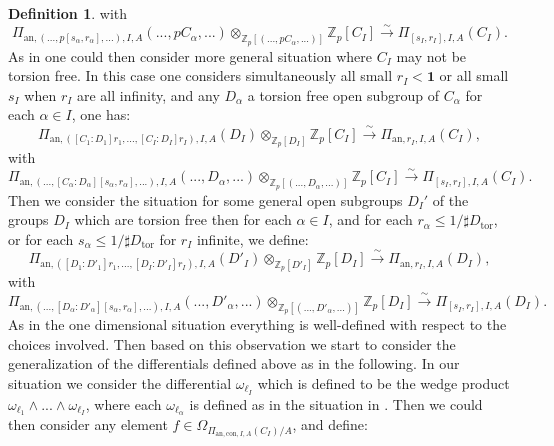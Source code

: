 \documentclass[12pt]{amsart}
\theoremstyle{definition}
\newtheorem{definition}[theorem]{Definition}
\numberwithin{equation}{section}
\begin{document}
\begin{definition}
with
\begin{displaymath}
\Pi_{\mathrm{an},(...,p[s_{\alpha},r_{\alpha}],...),I,A}(...,pC_\alpha,...)\otimes_{\mathbb{Z}_p[(...,pC_\alpha,...)]}	\mathbb{Z}_p[C_I]\overset{\sim}{\rightarrow} \Pi_{[s_I,r_{I}],I,A}(C_I).
\end{displaymath}
As in \cite[Definition 2.1.20]{KPX} one could then consider more general situation where $C_I$ may not be torsion free. In this case one considers simultaneously all small $r_I<\mathbf{1}$ or all small $s_I$ when $r_I$ are all infinity, and any $D_\alpha$ a torsion free open subgroup of $C_\alpha$ for each $\alpha\in I$, one has:
\begin{displaymath}
\Pi_{\mathrm{an},([C_1:D_1]r_1,...,[C_I:D_I]r_I),I,A}(D_I)\otimes_{\mathbb{Z}_p[D_I]}	\mathbb{Z}_p[C_I]\overset{\sim}{\rightarrow} \Pi_{\mathrm{an},r_{I},I,A}(C_I),
\end{displaymath}
with
\begin{displaymath}
\Pi_{\mathrm{an},(...,[C_\alpha:D_\alpha][s_{\alpha},r_{\alpha}],...),I,A}(...,D_\alpha,...)\otimes_{\mathbb{Z}_p[(...,D_\alpha,...)]}	\mathbb{Z}_p[C_I]\overset{\sim}{\rightarrow} \Pi_{[s_I,r_{I}],I,A}(C_I).
\end{displaymath}
Then we consider the situation for some general open subgroups $D_I'$ of the groups $D_I$ which are torsion free then for each $\alpha\in I$, and for each $r_\alpha\leq 1/\sharp D_\mathrm{tor}$, or for each $s_\alpha\leq 1/\sharp D_\mathrm{tor}$ for $r_I$ infinite, we define:
\begin{displaymath}
\Pi_{\mathrm{an},([D_1:D'_1]r_1,...,[D_I:D'_I]r_I),I,A}(D'_I)\otimes_{\mathbb{Z}_p[D'_I]}	\mathbb{Z}_p[D_I]\overset{\sim}{\rightarrow} \Pi_{\mathrm{an},r_{I},I,A}(D_I),
\end{displaymath}
with
\begin{displaymath}
\Pi_{\mathrm{an},(...,[D_\alpha:D'_\alpha][s_{\alpha},r_{\alpha}],...),I,A}(...,D'_\alpha,...)\otimes_{\mathbb{Z}_p[(...,D'_\alpha,...)]}	\mathbb{Z}_p[D_I]\overset{\sim}{\rightarrow} \Pi_{[s_I,r_{I}],I,A}(D_I).
\end{displaymath}
As in the one dimensional situation everything is well-defined with respect to the choices involved. Then based on this observation we start to consider the generalization of the differentials defined above as in the following. In our situation we consider the differential $\omega_{\ell_I}$ which is defined to be the wedge product $\omega_{\ell_1}\wedge...\wedge\omega_{\ell_I}$, where each $\omega_{\ell_\alpha}$ is defined as in the situation in \cite[Definition 2.1.20]{KPX}. Then we could then consider any element $f\in \Omega_{\Pi_{\mathrm{an},\mathrm{con},I,A}(C_I)/A}$, and define:

\end{definition}
\end{document}
